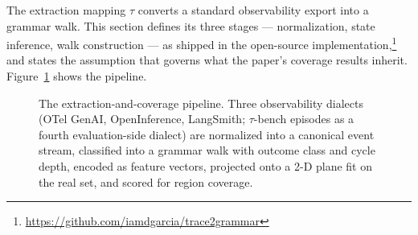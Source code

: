 The extraction mapping $\tau$ converts a standard observability export into a grammar walk.
This section defines its three stages --- normalization, state inference, walk construction ---
as shipped in the open-source implementation,\footnote{\url{https://github.com/iamdgarcia/trace2grammar}}
and states the assumption that governs what the paper's coverage results inherit.
Figure~\ref{fig:pipeline} shows the pipeline.

\begin{figure}[t]
\centering
\resizebox{\textwidth}{!}{}
\caption{The extraction-and-coverage pipeline.
Three observability dialects (OTel GenAI, OpenInference, LangSmith; $\tau$-bench episodes as a
fourth evaluation-side dialect) are normalized into a canonical event stream, classified into a
grammar walk with outcome class and cycle depth, encoded as feature vectors, projected onto a
2-D plane fit on the real set, and scored for region coverage.}
\label{fig:pipeline}
\end{figure}

